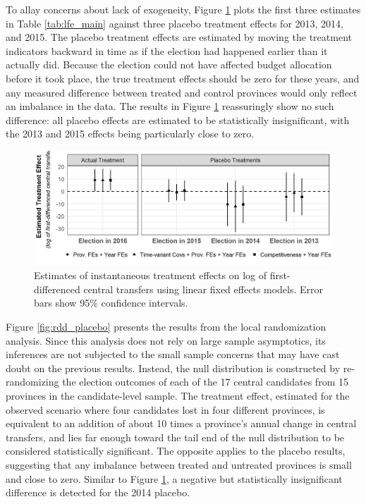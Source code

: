 \documentclass[12pt]{article}
\newcommand{\1}{\mathbbm{1}}
\begin{document}
To allay concerns about lack of exogeneity, Figure \ref{fig:lfe_placebo} plots the first three estimates in Table \ref{tab:lfe_main} against three placebo treatment effects for 2013, 2014, and 2015. The placebo treatment effects are estimated by moving the treatment indicators backward in time as if the election had happened earlier than it actually did. Because the election could not have affected budget allocation before it took place, the true treatment effects should be zero for these years, and any measured difference between treated and control provinces would only reflect an imbalance in the data. The results in Figure \ref{fig:lfe_placebo} reassuringly show no such difference: all placebo effects are estimated to be statistically insignificant, with the 2013 and 2015 effects being particularly close to zero.

\begin{figure}[!htbp]
	\centering
	\includegraphics[]{figure/210202_lfe_placebo.png}
	\captionsetup{singlelinecheck=off}
	\caption[Estimated placebo linear fixed effects treatment effects]{Estimates of instantaneous treatment effects on log of first-differenced central transfers using linear fixed effects models. Error bars show 95\% confidence intervals.}
	\label{fig:lfe_placebo}
\end{figure}

Figure \ref{fig:rdd_placebo} presents the results from the local randomization analysis. Since this analysis does not rely on large sample asymptotics, its inferences are not subjected to the small sample concerns that may have cast doubt on the previous results. Instead, the null distribution is constructed by re-randomizing the election outcomes of each of the 17 central candidates from 15 provinces in the candidate-level sample. The treatment effect, estimated for the observed scenario where four candidates lost in four different provinces, is equivalent to an addition of about 10 times a province's annual change in central transfers, and lies far enough toward the tail end of the null distribution to be considered statistically significant. The opposite applies to the placebo results, suggesting that any imbalance between treated and untreated provinces is small and close to zero. Similar to Figure \ref{fig:lfe_placebo}, a negative but statistically insignificant difference is detected for the 2014 placebo. 
\end{document}
